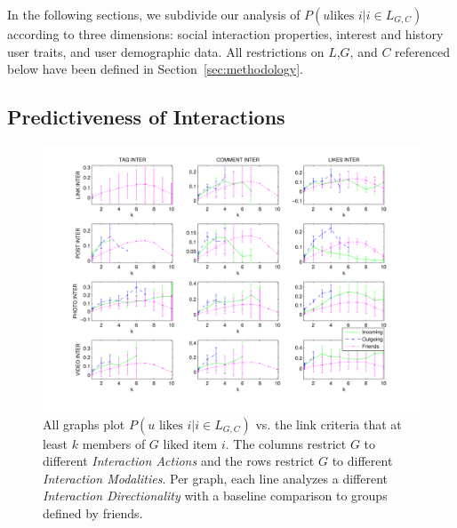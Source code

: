 
In the following sections, we subdivide our analysis of $P(u \mbox{
likes } i | i \in L_{G,C})$ according to three dimensions: social
interaction properties, interest and history user traits, and user
demographic data.  All restrictions on $L$,$G$, and $C$ referenced
below have been defined in Section~\ref{sec:methodology}.  

\subsection{Predictiveness of Interactions}

\label{sec:interactions}

\begin{figure}[t!]
\centering
\includegraphics[scale=0.70]{data/likes_vs_inter_fix}
\vspace{-15mm}
\caption{All graphs plot $P(u \mbox{ likes } i | i \in L_{G,C})$
vs. the link criteria that at least $k$ members of $G$ liked item $i$.
The columns restrict $G$ to different 
\textit{Interaction Actions} and the rows restrict $G$ to
different \textit{Interaction Modalities}.  Per graph, each line 
analyzes a different \textit{Interaction Directionality} with
a baseline comparison to groups defined by friends.}
\label{fig:res2}
\end{figure}

